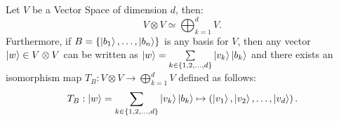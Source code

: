 \begin{lemma}\label{lemma:external-direct-sum-tensor-product}
    Let $V$ be a Vector Space of dimension $d$, then:
    \[V \otimes V \simeq \bigoplus_{k = 1}^d V.\]
    Furthermore, if $B = \{\ket{b_1}, \dots, \ket{b_n}\}$ is any basis for $V$, then any vector $\ket{w} \in V \otimes V$ can be written as  $\ket{w} = \sum\limits_{k \in \{1, 2, \dots, d\}} \ket{v_{k}} \ket{b_k}$ and there exists an isomorphism map $T_B: V \otimes V \to \bigoplus_{k = 1}^d V$ defined as follows:
    \begin{equation}
        T_B: \ket{w} = \sum\limits_{k \in \{1, 2, \dots, d\}}  \ket{v_{k}} \ket{b_k} \mapsto \left(\ket{v_1}, \ket{v_2}, \dots, \ket{v_d}\right).
    \end{equation}
\end{lemma}

